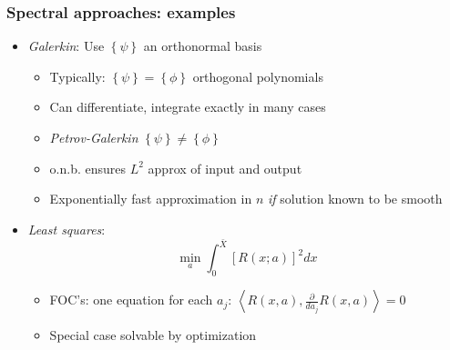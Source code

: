 \documentclass[bigger,handout]{beamer}
\begin{document}
\begin{frame}%

\frametitle{Spectral approaches: examples}

\begin{itemize}

\item \emph{Galerkin}: Use $\left\{\psi\right\}$ an orthonormal basis

\begin{itemize}
\item Typically: $\left\{\psi\right\}=\left\{\phi\right\}$ orthogonal polynomials
\item Can differentiate, integrate exactly in many cases
\item \emph{Petrov-Galerkin} $\left\{\psi\right\}\neq\left\{\phi\right\}$
\item o.n.b. ensures $L^2$ approx of input and output
\item Exponentially fast approximation in $n$ \emph{if} solution known to be smooth
\end{itemize}


\item \emph{Least squares}:%
\begin{equation*}
\min_{a}\int_{0}^{\bar{X}}\left[ R\left( x;a\right) \right] ^{2}dx
\end{equation*}

\begin{itemize}
\item FOC's: one equation for each $a_{j}$: $\left\langle R(x,a),\frac{\partial}{da_{j}}R(x,a)\right\rangle=0$
\item Special case solvable by optimization
\end{itemize}

\end{itemize}


\end{frame}%
\end{document}
